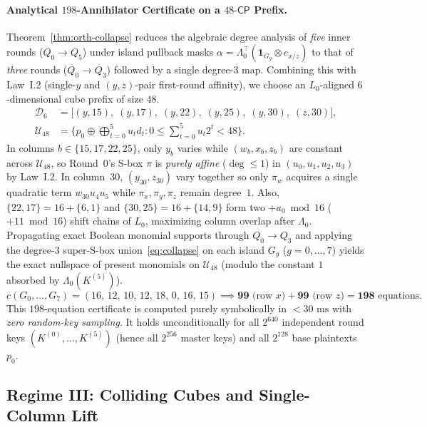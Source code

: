 \documentclass[11pt,a4paper]{article}
\theoremstyle{definition}
\theoremstyle{remark}
\newcommand{\CP}{\mathsf{CP}}
\begin{document}
\paragraph{Analytical $198$-Annihilator Certificate on a $48\text{-}\CP$ Prefix.}
Theorem~\ref{thm:orth-collapse} reduces the algebraic degree analysis of \emph{five} inner rounds ($Q_0 \to Q_5$) under island pullback masks $\alpha = \Lambda_0^\top(\mathbf{1}_{G_g} \otimes e_{x/z})$ to that of \emph{three} rounds ($Q_0 \to Q_3$) followed by a single degree-$3$ map. Combining this with Law~I.2 (single-$y$ and $(y,z)$-pair first-round affinity), we choose an $L_0$-aligned $6$-dimensional cube prefix of size $48$.
\begin{equation}
\label{eq:cube48}
\begin{aligned}
\mathcal{D}_6 &= \bigl[(y, 15),\; (y, 17),\; (y, 22),\; (y, 25),\; (y, 30),\; (z, 30)\bigr], \\
\mathcal{U}_{48} &= \bigl\{p_0 \oplus \textstyle\bigoplus_{t=0}^{5} u_t d_t : 0 \le \sum_{t=0}^{5} u_t 2^t < 48\bigr\}.
\end{aligned}
\end{equation}
In columns $b \in \{15, 17, 22, 25\}$, only $y_b$ varies while $(w_b, x_b, z_b)$ are constant across $\mathcal{U}_{48}$, so Round~$0$'s S-box $\pi$ is \emph{purely affine} ($\deg \le 1$) in $(u_0, u_1, u_2, u_3)$ by Law~I.2. In column~$30$, $(y_{30}, z_{30})$ vary together so only $\pi_w$ acquires a single quadratic term $w_{30} u_4 u_5$ while $\pi_x, \pi_y, \pi_z$ remain degree~$1$. Also, $\{22, 17\} = 16 + \{6, 1\}$ and $\{30, 25\} = 16 + \{14, 9\}$ form two $+a_0 \bmod 16$ ($+11 \bmod 16$) shift chains of $L_0$, maximizing column overlap after $\Lambda_0$. Propagating exact Boolean monomial supports through $Q_0 \to Q_3$ and applying the degree-$3$ super-S-box union~\eqref{eq:collapse} on each island $G_g$ ($g = 0, \dots, 7$) yields the exact nullspace of present monomials on $\mathcal{U}_{48}$ (modulo the constant $1$ absorbed by $\Lambda_0(K^{(5)})$).
\[
c(G_0, \dots, G_7) = (16,\, 12,\, 10,\, 12,\, 18,\, 0,\, 16,\, 15) \implies \mathbf{99} \text{ (row } x\text{)} + \mathbf{99} \text{ (row } z\text{)} = \mathbf{198} \text{ equations.}
\]
This $198$-equation certificate is computed purely symbolically in $<30\text{ ms}$ with \emph{zero random-key sampling}. It holds unconditionally for all $2^{640}$ independent round keys $(K^{(0)}, \dots, K^{(5)})$ (hence all $2^{256}$ master keys) and all $2^{128}$ base plaintexts $p_0$.

\subsection{Regime III: Colliding Cubes and Single-Column Lift}
\label{subsec:regime3}
\label{subsec:7r-8r}
\end{document}
